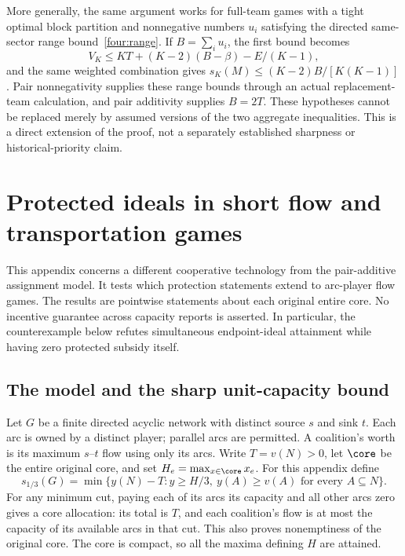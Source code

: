 \begin{remark}\label{four:exchange}
More generally, the same argument works for full-team games with a tight
optimal block partition and nonnegative numbers $u_i$ satisfying the
directed same-sector range bound~\eqref{four:range}. If
$B=\sum_i u_i$, the first bound becomes
\[
       V_K\le KT+(K-2)(B-\beta)-E/(K-1),
\]
and the same weighted combination gives
$s_K(M)\le (K-2)B/[K(K-1)]$.
Pair nonnegativity supplies these range bounds through an actual
replacement-team calculation, and pair additivity supplies $B=2T$.
These hypotheses cannot be replaced merely by assumed versions of the
two aggregate inequalities. This is a direct extension of the proof,
not a separately established sharpness or historical-priority claim.
\end{remark}

\section{Protected ideals in short flow and transportation games}\label{flow:section}
This appendix concerns a different cooperative technology from the
pair-additive assignment model. It tests which protection statements extend
to arc-player flow games. The results are pointwise statements about each
original entire core. No incentive guarantee across capacity reports is
asserted. In particular, the counterexample below refutes simultaneous
endpoint-ideal attainment while having zero protected subsidy itself.

\subsection{The model and the sharp unit-capacity bound}
Let $G$ be a finite directed acyclic network with distinct source $s$ and
sink $t$. Each arc is owned by a distinct player; parallel arcs are
permitted. A coalition's worth is its maximum $s$--$t$ flow using only its
arcs. Write $T=v(N)>0$, let $\core$ be the entire original core, and set
$H_e=\max_{x\in\core}x_e$. For this appendix define
\[
 s_{1/3}(G)=\min\{y(N)-T:y\ge H/3,\ y(A)\ge v(A)
                                   \text{ for every }A\subseteq N\}.
\]
For any minimum cut, paying each of its arcs its capacity and all other
arcs zero gives a core allocation: its total is $T$, and each coalition's
flow is at most the capacity of its available arcs in that cut. This
also proves nonemptiness of the original core. The core is compact, so
all the maxima defining $H$ are attained.

